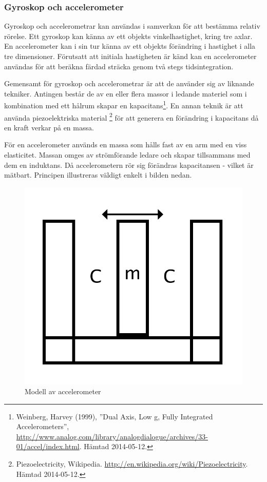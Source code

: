 \documentclass[a4paper,12pt,fleqn]{article}
\begin{document}
\newpage

\subsubsection{Gyroskop och accelerometer}

Gyroskop och accelerometrar kan användas i samverkan för att bestämma relativ rörelse. Ett gyroskop kan känna av ett objekts vinkelhastighet, kring tre axlar. En accelerometer kan i sin tur känna av ett objekts förändring i hastighet i alla tre dimensioner. Förutsatt att initiala hastigheten är känd kan en accelerometer användas för att beräkna färdad sträcka genom två stegs tidsintegration. 

Gemensamt för gyroskop och accelerometrar är att de använder sig av liknande tekniker. Antingen består de av en eller flera massor i ledande materiel som i kombination med ett hålrum skapar en kapacitans\footnote{Weinberg, Harvey (1999), ''Dual Axis, Low g, Fully Integrated Accelerometers'', \url{http://www.analog.com/library/analogdialogue/archives/33-01/accel/index.html}. Hämtad 2014-05-12.}. En annan teknik är att använda piezoelektriska material \footnote{Piezoelectricity, Wikipedia. \url{http://en.wikipedia.org/wiki/Piezoelectricity}. Hämtad 2014-05-12.} för att generera en förändring i kapacitans då en kraft verkar på en massa. 

För en accelerometer används en massa som hålls fast av en arm med en viss elasticitet. Massan omges av strömförande ledare och skapar tillsammans med dem en induktans. Då accelerometern rör sig förändras kapacitansen - vilket är mätbart. Principen illustreras väldigt enkelt i bilden nedan.

\begin{figure}[htp] %
  \begin{center}
  \includegraphics[keepaspectratio=true,scale=0.5]{accelerometer.png}  %
  \end{center}
  \caption{Modell av accelerometer} %
  \label{fig:accelerometer}
\end{figure}
\end{document}
